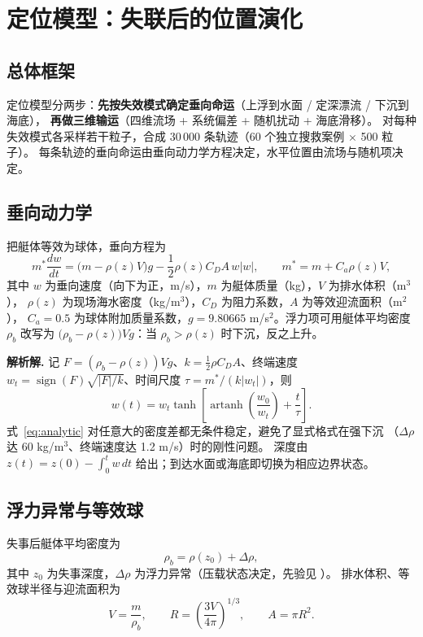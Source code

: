 \section{定位模型：失联后的位置演化}

\subsection{总体框架}

定位模型分两步：\textbf{先按失效模式确定垂向命运}（上浮到水面 / 定深漂流 / 下沉到海底），
\textbf{再做三维输运}（四维流场 + 系统偏差 + 随机扰动 + 海底滑移）。
对每种失效模式各采样若干粒子，合成 30\,000 条轨迹（60 个独立搜救案例 $\times$ 500 粒子）。
每条轨迹的垂向命运由垂向动力学方程决定，水平位置由流场与随机项决定。

\subsection{垂向动力学}

把艇体等效为球体，垂向方程为
\begin{equation}
  m^* \frac{dw}{dt} = \bigl(m - \rho(z) V\bigr) g - \frac{1}{2}\rho(z) C_D A\, w|w|,
  \qquad m^* = m + C_a \rho(z) V,
  \label{eq:vertical}
\end{equation}
其中 $w$ 为垂向速度（向下为正，m/s），$m$ 为艇体质量（kg），$V$ 为排水体积（m$^3$），
$\rho(z)$ 为现场海水密度（kg/m$^3$），$C_D$ 为阻力系数，$A$ 为等效迎流面积（m$^2$），
$C_a=0.5$ 为球体附加质量系数，$g=9.80665$ m/s$^2$。浮力项可用艇体平均密度 $\rho_b$ 改写为
$\bigl(\rho_b-\rho(z)\bigr)Vg$：当 $\rho_b>\rho(z)$ 时下沉，反之上升。

\textbf{解析解.} 记 $F=(\rho_b-\rho(z))Vg$、$k=\tfrac12\rho C_D A$、终端速度
$w_t=\operatorname{sign}(F)\sqrt{|F|/k}$、时间尺度 $\tau=m^*/(k|w_t|)$，则
\begin{equation}
  w(t) = w_t \tanh\!\left[\operatorname{artanh}\!\left(\frac{w_0}{w_t}\right) + \frac{t}{\tau}\right].
  \label{eq:analytic}
\end{equation}
式~\eqref{eq:analytic} 对任意大的密度差都无条件稳定，避免了显式格式在强下沉
（$\Delta\rho$ 达 60 kg/m$^3$、终端速度达 1.2 m/s）时的刚性问题。
深度由 $z(t)=z(0)-\int_0^t w\,dt$ 给出；到达水面或海底即切换为相应边界状态。

\subsection{浮力异常与等效球}

失事后艇体平均密度为
\begin{equation}
  \rho_b = \rho(z_0) + \Delta\rho,
\end{equation}
其中 $z_0$ 为失事深度，$\Delta\rho$ 为浮力异常（压载状态决定，先验见 ）。
排水体积、等效球半径与迎流面积为
\begin{equation}
  V = \frac{m}{\rho_b},\qquad
  R = \left(\frac{3V}{4\pi}\right)^{1/3},\qquad
  A = \pi R^2.
\end{equation}

